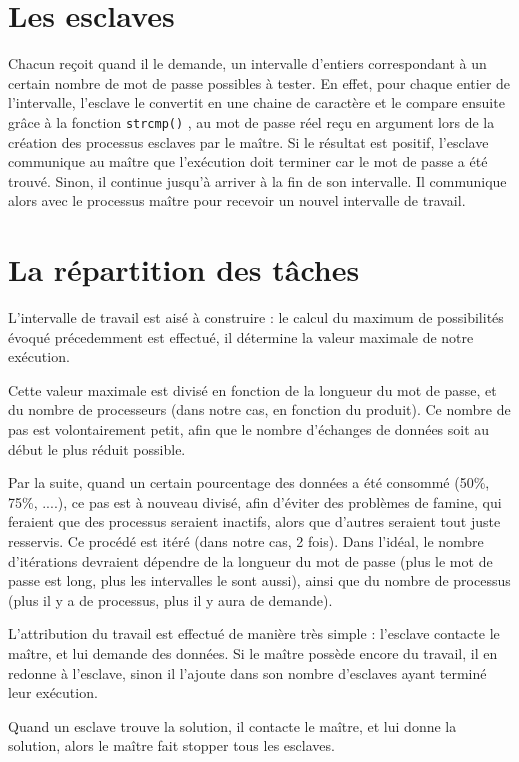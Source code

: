 \documentclass[a4paper,11pt]{article}
\begin{document}
\section{Les esclaves}
Chacun reçoit quand il le demande, un intervalle d'entiers correspondant à un certain nombre de mot de passe possibles à tester.
En effet, pour chaque entier de l'intervalle, l'esclave le convertit en une chaine de caractère et le compare ensuite grâce à la fonction \texttt{strcmp()} , au mot de passe réel reçu en argument lors de la création des processus esclaves par le maître. Si le résultat est positif, l'esclave communique au maître que l'exécution doit terminer car le mot de passe a été trouvé. Sinon, il continue jusqu'à arriver à la fin de son intervalle. Il communique alors avec le processus maître pour recevoir un nouvel intervalle de travail.


\section{La répartition des tâches}
L'intervalle de travail est aisé à construire : le calcul du maximum de possibilités évoqué précedemment est effectué, il détermine la valeur maximale de notre exécution.

Cette valeur maximale est divisé en fonction de la longueur du mot de passe, et du nombre de processeurs (dans notre cas, en fonction du produit).
Ce nombre de pas est volontairement petit, afin que le nombre d'échanges de données soit au début le plus réduit possible.

Par la suite,  quand un certain pourcentage des données a été consommé (50\%, 75\%, ....), ce pas est à nouveau divisé, afin d'éviter des problèmes de famine, qui feraient que des processus seraient inactifs, alors que d'autres seraient tout juste resservis.
Ce procédé est itéré (dans notre cas, 2 fois). Dans l'idéal, le nombre d'itérations devraient dépendre de la longueur du mot de passe (plus le mot de passe est long, plus les intervalles le sont aussi), ainsi que du nombre de processus (plus il y a de processus, plus il y aura de demande).

L'attribution du travail est effectué de manière très simple : l'esclave contacte le maître, et lui demande des données.
Si le maître possède encore du travail, il en redonne à l'esclave, sinon il l'ajoute dans son nombre d'esclaves ayant terminé leur exécution.

Quand un esclave trouve la solution, il contacte le maître, et lui donne la solution, alors le maître fait stopper tous les esclaves.
\end{document}
